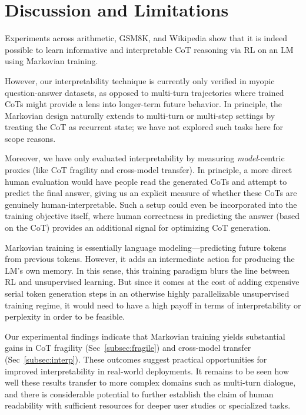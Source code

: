 \documentclass{article}
\theoremstyle{plain}
\theoremstyle{definition}
\theoremstyle{remark}
\begin{document}
\section{Discussion and Limitations}
\label{sec:disc}

Experiments across arithmetic, GSM8K, and Wikipedia show that it is indeed possible to learn informative and interpretable CoT reasoning via RL on an LM using Markovian training.

However, our interpretability technique is currently only verified in myopic question-answer datasets, as opposed to multi-turn trajectories where trained CoTs might provide a lens into longer-term future behavior. In principle, the Markovian design naturally extends to multi-turn or multi-step settings by treating the CoT as recurrent state; we have not explored such tasks here for scope reasons.

Moreover, we have only evaluated interpretability by measuring \emph{model}-centric proxies (like CoT fragility and cross-model transfer). In principle, a more direct human evaluation would have people read the generated CoTs and attempt to predict the final answer, giving us an explicit measure of whether these CoTs are genuinely human-interpretable. Such a setup could even be incorporated into the training objective itself, where human correctness in predicting the answer (based on the CoT) provides an additional signal for optimizing CoT generation.

Markovian training is essentially language modeling—predicting future tokens from previous tokens. However, it adds an intermediate action for producing the LM's own memory. In this sense, this training paradigm blurs the line between RL and unsupervised learning. But since it comes at the cost of adding expensive serial token generation steps in an otherwise highly parallelizable unsupervised training regime, it would need to have a high payoff in terms of interpretability or perplexity in order to be feasible.

Our experimental findings indicate that Markovian training yields substantial gains in CoT fragility (Sec~\ref{subsec:fragile}) and cross-model transfer (Sec~\ref{subsec:interp}). These outcomes suggest practical opportunities for improved interpretability in real-world deployments. It remains to be seen how well these results transfer to more complex domains such as multi-turn dialogue, and there is considerable potential to further establish the claim of human readability with sufficient resources for deeper user studies or specialized tasks.
\end{document}
